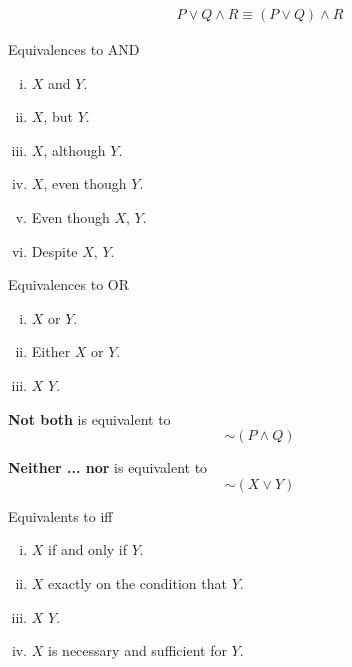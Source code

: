 \documentclass[11pt]{article}
\begin{document}
		\begin{example}
			\begin{gather}
				P \lor Q \land R \equiv (P \lor Q) \land R
			\end{gather}
		\end{example}
		
		\begin{remark} Equivalences to AND
			\begin{enumerate}[(i)]
				\item $X$ and $Y$.
				\item $X$, but $Y$.
				\item $X$, although $Y$.
				\item $X$, even though $Y$.
				\item Even though $X$, $Y$.
				\item Despite $X$, $Y$.
			\end{enumerate}
		\end{remark}
		
		\begin{remark} Equivalences to OR
			\begin{enumerate}[(i)]
				\item $X$ or $Y$.
				\item Either $X$ or $Y$.
				\item $X$  $Y$.
			\end{enumerate}
		\end{remark}
		
		\begin{remark}
			\textbf{Not both} is equivalent to
			\begin{equation}
				\sim (P \land Q)
			\end{equation}
		\end{remark}
		
		\begin{remark}
			\textbf{Neither ... nor} is equivalent to
			\begin{equation}
				\sim (X \lor Y)
			\end{equation}
		\end{remark}
		
		\begin{remark} Equivalents to iff
			\begin{enumerate}[(i)]
				\item $X$ if and only if $Y$.
				\item $X$ exactly on the condition that $Y$.
				\item $X$  $Y$.
				\item $X$ is necessary and sufficient for $Y$.
			\end{enumerate}
		\end{remark}
		
\end{document}
